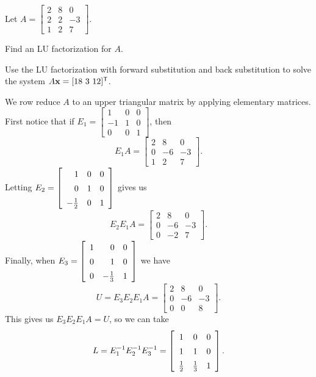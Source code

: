 \begin{example} Let $A = \left[ \begin{array}{ccr} 2&8&0\\2&2&-3\\1&2&7 \end{array} \right]$.
	\ba
	\item Find an LU factorization for $A$.
	
	\item Use the LU factorization with forward substitution and back substitution to solve the system $A \mathbf{x} = [18 \ 3 \ 12]^{\mathsf{T}}$. 
	
	\ea

\ExampleSolution
\ba
\item We row reduce $A$ to an upper triangular matrix by applying elementary matrices. First notice that if $E_1 = \left[ \begin{array}{rcc} 1&0&0 \\-1&1&0 \\ 0&0&1 \end{array} \right]$, then 
\[E_1 A = \left[ \begin{array}{crr} 2&8&0 \\ 0&-6&-3 \\ 1&2&7 \end{array} \right].\]
Letting $E_2 =  \left[\renewcommand{\arraystretch}{1.4} \begin{array}{rcc} 1&0&0 \\0&1&0 \\ -\frac{1}{2}&0&1 \end{array} \right]$ gives us
\[E_2E_1A = \left[ \begin{array}{crr} 2&8&0 \\ 0&-6&-3 \\ 0&-2&7 \end{array} \right].\]
Finally, when $E_3 = \left[\renewcommand{\arraystretch}{1.4} \begin{array}{crc} 1&0&0 \\0&1&0 \\ 0&-\frac{1}{3}&1 \end{array} \right]$ we have 
\[U=E_3E_2E_1A = \left[ \begin{array}{crr} 2&8&0 \\ 0&-6&-3 \\ 0&0&8 \end{array} \right].\]
This gives us $E_3E_2E_1A = U$, so we can take
\[L = E_1^{-1}E_2^{-1}E_3^{-1} =  \left[\renewcommand{\arraystretch}{1.4} \begin{array}{ccc} 1&0&0 \\1&1&0 \\ \frac{1}{2}&\frac{1}{3}&1 \end{array} \right].\]


\end{example}
